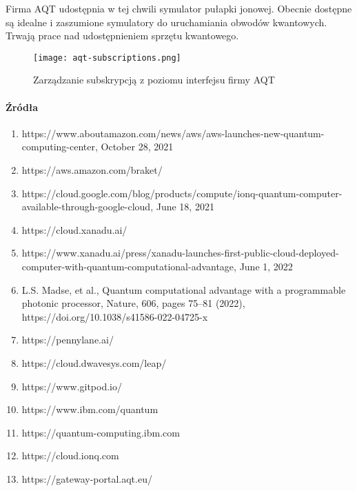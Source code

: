 \documentclass[a4paper,12pt
]{article}
\providecommand{\tightlist}{%
  \setlength{\itemsep}{0pt}\setlength{\parskip}{0pt}}
\begin{document}
Firma AQT udostępnia w tej chwili symulator pułapki jonowej. Obecnie
dostępne są idealne i zaszumione symulatory do uruchamiania obwodów
kwantowych. Trwają prace nad udostępnieniem sprzętu kwantowego.

\begin{figure}
\centering
\texttt{[image: aqt-subscriptions.png]}
\caption{Zarządzanie subskrypcją z poziomu interfejsu firmy AQT}
\end{figure}

\hypertarget{ux17aruxf3dux142a}{%
\paragraph{Źródła}\label{ux17aruxf3dux142a}}

\begin{enumerate}
\def\labelenumi{\arabic{enumi}.}
\tightlist
\item
  https://www.aboutamazon.com/news/aws/aws-launches-new-quantum-computing-center,
  October 28, 2021
\item
  https://aws.amazon.com/braket/
\item
  https://cloud.google.com/blog/products/compute/ionq-quantum-computer-available-through-google-cloud,
  June 18, 2021
\item
  https://cloud.xanadu.ai/
\item
  https://www.xanadu.ai/press/xanadu-launches-first-public-cloud-deployed-computer-with-quantum-computational-advantage,
  June 1, 2022
\item
  L.S. Madse, et al., Quantum computational advantage with a
  programmable photonic processor, Nature, 606, pages 75--81 (2022),
  https://doi.org/10.1038/s41586-022-04725-x
\item
  https://pennylane.ai/
\item
  https://cloud.dwavesys.com/leap/
\item
  https://www.gitpod.io/
\item
  https://www.ibm.com/quantum
\item
  https://quantum-computing.ibm.com
\item
  https://cloud.ionq.com
\item
  https://gateway-portal.aqt.eu/
\end{enumerate}
\end{document}

